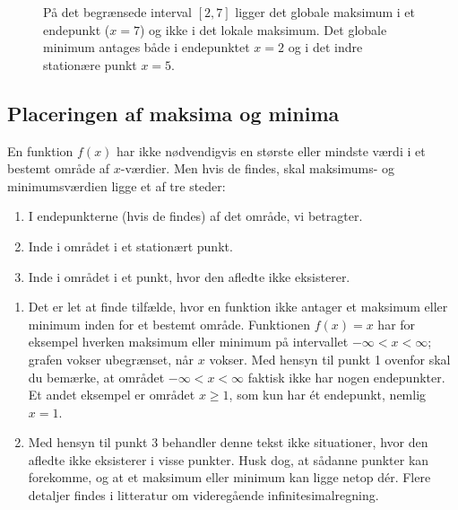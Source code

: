 \begin{figure}[htbp]
    \caption{På det begrænsede interval \([2, 7]\) ligger det globale maksimum i et endepunkt (\(x=7\)) og ikke i det lokale maksimum. Det globale minimum antages både i endepunktet \(x=2\) og i det indre stationære punkt \(x=5\).}
    \label{fig:restricted-domain-extrema}
\end{figure}

\subsection*{Placeringen af maksima og minima}
En funktion $f(x)$ har ikke nødvendigvis en største eller mindste værdi i et bestemt område af $x$-værdier. Men hvis de findes, skal maksimums- og minimumsværdien ligge et af tre steder:

\begin{enumerate}
  \item I endepunkterne (hvis de findes) af det område, vi betragter.
  \item Inde i området i et stationært punkt.
  \item Inde i området i et punkt, hvor den afledte ikke eksisterer.
\end{enumerate}

\begin{remark}
    

\begin{enumerate}
  \item Det er let at finde tilfælde, hvor en funktion ikke antager et maksimum eller minimum inden for et bestemt område. Funktionen $f(x) = x$ har for eksempel hverken maksimum eller minimum på intervallet $-\infty < x < \infty$; grafen vokser ubegrænset, når $x$ vokser. Med hensyn til punkt 1 ovenfor skal du bemærke, at området $-\infty < x < \infty$ faktisk ikke har nogen endepunkter. Et andet eksempel er området $x \geq 1$, som kun har ét endepunkt, nemlig $x = 1$.
  \item Med hensyn til punkt 3 behandler denne tekst ikke situationer, hvor den afledte ikke eksisterer i visse punkter. Husk dog, at sådanne punkter kan forekomme, og at et maksimum eller minimum kan ligge netop dér. Flere detaljer findes i litteratur om videregående infinitesimalregning.
\end{enumerate}
\end{remark}

